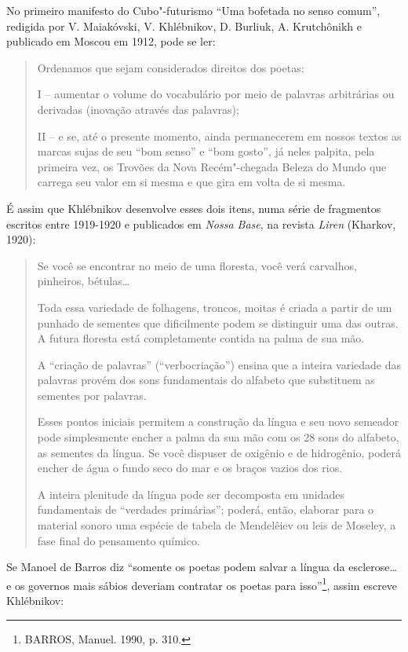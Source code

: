 No primeiro manifesto do Cubo"-futurismo ``Uma bofetada no senso comum'',
redigida por V. Maiakóvski, V. Khlébnikov, D. Burliuk, A. Krutchônikh e
publicado em Moscou em 1912, pode se ler:

\begin{quote}
Ordenamos que sejam considerados direitos dos poetas:

I -- aumentar o volume do vocabulário por meio de palavras arbitrárias
ou derivadas (inovação através das palavras);

II -- e se, até o presente momento, ainda permanecerem em nossos textos
as marcas sujas de seu ``bom senso'' e ``bom gosto'', já neles palpita,
pela primeira vez, os Trovões da Nova Recém"-chegada Beleza do Mundo que
carrega seu valor em si mesma e que gira em volta de si mesma.
\end{quote}

É assim que Khlébnikov desenvolve esses dois itens, numa série de
fragmentos escritos entre 1919-1920 e publicados em \emph{Nossa Base},
na revista \emph{Liren} (Kharkov, 1920):

\begin{quote}
Se você se encontrar no meio de uma floresta, você verá carvalhos,
pinheiros, bétulas\ldots{}

Toda essa variedade de folhagens, troncos, moitas é criada a partir de
um punhado de sementes que dificilmente podem se distinguir uma das
outras. A futura floresta está completamente contida na palma de sua
mão.

A ``criação de palavras'' (``verbocriação'') ensina que a inteira
variedade das palavras provém dos sons fundamentais do alfabeto que
substituem as sementes por palavras.

Esses pontos iniciais permitem a construção da língua e seu novo
semeador pode simplesmente encher a palma da sua mão com os 28 sons do
alfabeto, as sementes da língua. Se você dispuser de oxigênio e de
hidrogênio, poderá encher de água o fundo seco do mar e os braços vazios
dos rios.

A inteira plenitude da língua pode ser decomposta em unidades
fundamentais de ``verdades primárias''; poderá, então, elaborar para o
material sonoro uma espécie de tabela de Mendelêiev ou leis de Moseley,
a fase final do pensamento químico.
\end{quote}

Se Manoel de Barros diz ``somente os poetas podem salvar a língua da
esclerose\ldots{} e os governos mais sábios deveriam contratar os poetas para
isso''\footnote{BARROS, Manuel. 1990, p. 310.}, assim escreve
Khlébnikov:

